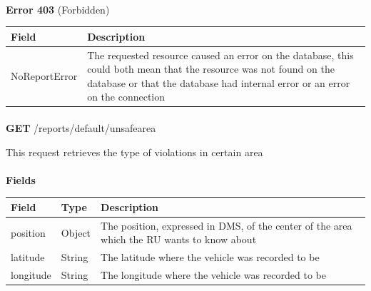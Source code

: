 						\paragraph{}
							\textbf{Error 403} (Forbidden)
							\begin{table}[!h]
								\begin{tabular}{L{0.4\textwidth}L{0.4\textwidth}}
									\toprule
									Field & Description \\
									\midrule
								  	 NoReportError & The requested resource caused an error on the database, this could both mean that the resource was not found on the database or that the database had internal error or an error on the connection \\
								 	\bottomrule
								\end{tabular}
							\end{table}
	
						\paragraph{}
						\textbf{GET} /reports/default/unsafearea
						
						This request retrieves the type of violations in certain area
						\paragraph{}
							\textbf{Fields}
							\begin{table}[!h]
								\begin{tabular}{L{0.23\textwidth}L{0.15\textwidth}L{0.42\textwidth}}
									\toprule
									Field & Type & Description \\
									\midrule
								 	 position & Object & The position, expressed in DMS, of the center of the area which the RU wants to know about \\
								 	 \hspace{2.5mm} latitude & String & The latitude where the vehicle was recorded to be \\
								 	 \hspace{2.5mm} longitude & String & The longitude where the vehicle was recorded to be \\
								 	\bottomrule
								\end{tabular}
							\end{table}
